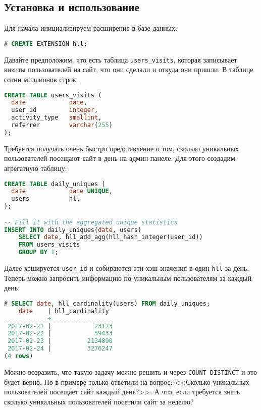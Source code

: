 \subsection{Установка и использование}

Для начала инициализируем расширение в базе данных:

\begin{lstlisting}[language=SQL,label=lst:pghll1,caption=Инициализация hll]
# CREATE EXTENSION hll;
\end{lstlisting}

Давайте предположим, что есть таблица \lstinline!users_visits!, которая записывает визиты пользователей на сайт, что они сделали и откуда они пришли. В таблице сотни миллионов строк.

\begin{lstlisting}[language=SQL,label=lst:pghll2,caption=users\_visits]
CREATE TABLE users_visits (
  date            date,
  user_id         integer,
  activity_type   smallint,
  referrer        varchar(255)
);
\end{lstlisting}

Требуется получать очень быстро представление о том, сколько уникальных пользователей посещают сайт в день на админ панеле. Для этого создадим агрегатную таблицу:

\begin{lstlisting}[language=SQL,label=lst:pghll3,caption=daily\_uniques]
CREATE TABLE daily_uniques (
  date            date UNIQUE,
  users           hll
);

-- Fill it with the aggregated unique statistics
INSERT INTO daily_uniques(date, users)
    SELECT date, hll_add_agg(hll_hash_integer(user_id))
    FROM users_visits
    GROUP BY 1;
\end{lstlisting}

Далее хэшируется \lstinline!user_id! и собираются эти хэш-значения в один \lstinline!hll! за день. Теперь можно запросить информацию по уникальным пользователям за каждый день:

\begin{lstlisting}[language=SQL,label=lst:pghll4,caption=daily\_uniques по дням]
# SELECT date, hll_cardinality(users) FROM daily_uniques;
    date    | hll_cardinality
------------+-----------------
 2017-02-21 |            23123
 2017-02-22 |            59433
 2017-02-23 |          2134890
 2017-02-24 |          3276247
(4 rows)
\end{lstlisting}

Можно возразить, что такую задачу можно решить и через \lstinline!COUNT DISTINCT! и это будет верно. Но в примере только ответили на вопрос: <<Сколько уникальных пользователей посещает сайт каждый день?>>. А что, если требуется знать сколько уникальных пользователей посетили сайт за неделю?

